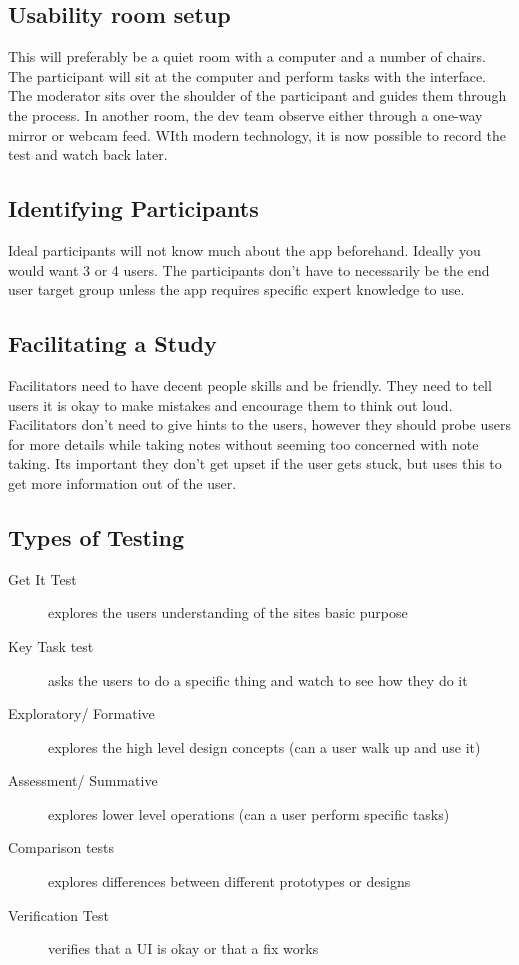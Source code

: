\subsection*{Usability room setup}
This will preferably be a quiet room with a computer and a number of chairs. The participant will sit at the computer and perform tasks with the interface. The moderator sits over the shoulder of the participant and guides them through the process. In another room, the dev team observe either through a one-way mirror or webcam feed. WIth modern technology, it is now possible to record the test and watch back later.

\subsection*{Identifying Participants}
Ideal participants will not know much about the app beforehand. Ideally you would want 3 or 4 users. The participants don't have to necessarily be the end user target group unless the app requires specific expert knowledge to use.

\subsection*{Facilitating a Study}
Facilitators need to have decent people skills and be friendly. They need to tell users it is okay to make mistakes and encourage them to think out loud. Facilitators don't need to give hints to the users, however they should probe users for more details while taking notes without seeming too concerned with note taking. Its important they don't get upset if the user gets stuck, but uses this to get more information out of the user.

\subsection*{Types of Testing}
\begin{description}
    \item[Get It Test] explores the users understanding of the sites basic purpose
    \item[Key Task test] asks the users to do a specific thing and watch to see how they do it
    \item[Exploratory/ Formative] explores the high level design concepts (can a user walk up and use it)
    \item[Assessment/ Summative] explores lower level operations (can a user perform specific tasks)
    \item[Comparison tests] explores differences between different prototypes or designs
    \item[Verification Test] verifies that a UI is okay or that a fix works   
\end{description}

